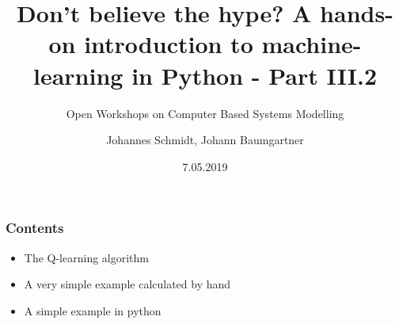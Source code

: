\documentclass[color=usenames,dvipsnames]{beamer}
\title[Workshop - Machine Learning]{ Don't believe the hype? A hands-on introduction to machine-learning in Python - Part III.2}
\subtitle{Open Workshops on Computer Based Systems Modelling}
\author{Johannes Schmidt, Johann Baumgartner}
\institute{Institute for Sustainable Economic Development, BOKU, Vienna}
\date{7.05.2019}
\begin{document}
{


\begin{frame}

\maketitle



\end{frame}
}
\begin{frame}
\frametitle{Contents}
\begin{itemize}
	\item The Q-learning algorithm
	\item A very simple example calculated by hand
	\item A simple example in python
\end{itemize}

\end{frame}
\end{document}

